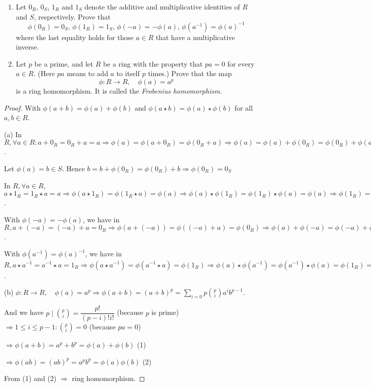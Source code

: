 \begin{enumerate}
    \item[(a)] Let $0_R$, $0_S$, $1_R$ and $1_S$ denote the additive and multiplicative identities of $R$ and $S$, respectively. Prove that
    \begin{equation*}
        \phi(0_R)=0_S, \, \phi(1_R)=1_S, \, \phi(-a)=-\phi(a), \, \phi(a^{-1})=\phi(a)^{-1}
    \end{equation*}
    where the last equality holds for those $a \in R$ that have a multiplicative inverse.

    \item[(b)] Let $p$ be a prime, and let $R$ be a ring with the property that $pa = 0$ for every $a \in R$. (Here $pa$ means to add $a$ to itself $p$ times.) Prove that the map 
    \begin{equation*}
        \phi: R \rightarrow R, \quad \phi(a)=a^p
    \end{equation*}
    is a ring homomorphism. It is called the \textit{Frobenius homomorphism.}
\end{enumerate}

\begin{proof}
    With $\phi(a+b)=\phi(a)+\phi(b)$ and $\phi(a \star b) = \phi(a) \star \phi(b)$ for all $a, b \in R$.

    (a) In $R, \forall a \in R: a+0_R=0_R+a=a \Rightarrow \phi(a)=\phi(a+0_R)=\phi(0_R+a) \Rightarrow \phi(a)=\phi(a)+\phi(0_R)=\phi(0_R)+\phi(a)$.

    Let $\phi(a)=b \in S$. Hence $b=b+\phi(0_R)=\phi(0_R)+b \Rightarrow \phi(0_R)=0_S$

    In $R, \forall a \in R$, $a \star 1_R = 1_R \star a = a \Rightarrow \phi(a \star 1_R) = \phi(1_R \star a) = \phi(a) \Rightarrow \phi(a) \star \phi(1_R) = \phi(1_R) \star \phi(a) = \phi(a) \Rightarrow \phi(1_R) = 1_S$.

    With $\phi(-a) = -\phi(a)$, we have in $R, a + (-a) = (-a) + a = 0_R \Rightarrow \phi(a+(-a))=\phi((-a)+a)=\phi(0_R) \Rightarrow \phi(a)+\phi(-a)=\phi(-a)+\phi(a)=\phi(0_R)=0_S \Rightarrow \phi(-a) = -\phi(a)$.

    With $\phi(a^{-1}) = \phi(a)^{-1}$, we have in $R, a \star a^{-1} = a^{-1} \star a = 1_R \Rightarrow \phi(a \star a^{-1}) = \phi(a^{-1} \star a) = \phi(1_R) \Rightarrow \phi(a) \star \phi(a^{-1}) = \phi(a^{-1}) \star \phi(a) = \phi(1_R) = 1_S \Rightarrow \phi(a^{-1})=\phi(a)^{-1}$.

    (b) $\phi: R \rightarrow R, \quad \phi(a)=a^p \Rightarrow \displaystyle{\phi(a+b)=(a+b)^p=\sum_{i=0}{p} \binom{p}{i} a^i b^{p-1}}$.

    And we have $p \mid \binom{p}{i} = \dfrac{p!}{(p-i)!i!}$ (because $p$ is prime) $\Rightarrow 1 \leqslant i \leqslant p-1: \binom{p}{i} = 0$ (because $pa=0$)

    $\Rightarrow \phi(a+b)=a^p+b^p=\phi(a)+\phi(b)$ (1)

    $\Rightarrow \phi(ab)=(ab)^p=a^p b^p = \phi(a) \phi(b)$ (2)

    From (1) and (2) $\Rightarrow$ ring homomorphism.
\end{proof}

